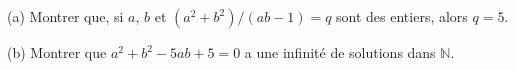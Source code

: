 (a) Montrer que, si $a$, $b$ et $(a^2 + b^2)/(ab - 1) = q$ sont des entiers, alors $q = 5$.

(b) Montrer que $a^2 + b^2 - 5ab + 5 = 0$ a une infinité de solutions dans $\mathbb{N}$.
